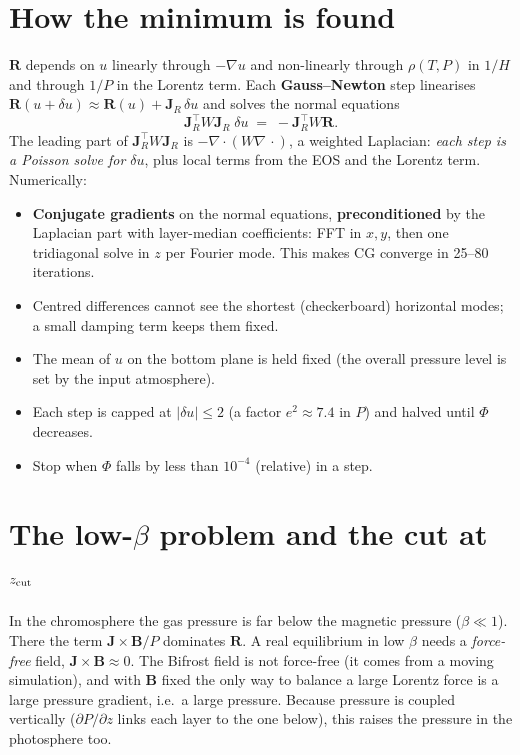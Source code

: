\documentclass[10pt]{extarticle}
\newcommand{\B}{\mathbf B}\newcommand{\J}{\mathbf J}\newcommand{\F}{\mathbf F}\newcommand{\zh}{\hat{\mathbf z}}
\begin{document}
\section{How the minimum is found}
$\mathbf R$ depends on $u$ linearly through $-\nabla u$ and non-linearly through $\rho(T,P)$ in $1/H$ and through $1/P$ in
the Lorentz term. Each \textbf{Gauss--Newton} step linearises $\mathbf R(u+\delta u)\approx\mathbf R(u)+\mathbf J_R\,\delta u$
and solves the normal equations
\[
\mathbf J_R^{\!\top}W\mathbf J_R\;\delta u \;=\; -\mathbf J_R^{\!\top}W\mathbf R .
\]
The leading part of $\mathbf J_R^{\!\top}W\mathbf J_R$ is $-\nabla\!\cdot(W\nabla\,\cdot)$, a weighted Laplacian: \emph{each
step is a Poisson solve for $\delta u$}, plus local terms from the EOS and the Lorentz term. Numerically:
\begin{itemize}
\item \textbf{Conjugate gradients} on the normal equations, \textbf{preconditioned} by the Laplacian part with layer-median
coefficients: FFT in $x,y$, then one tridiagonal solve in $z$ per Fourier mode. This makes CG converge in 25--80 iterations.
\item Centred differences cannot see the shortest (checkerboard) horizontal modes; a small damping term keeps them fixed.
\item The mean of $u$ on the bottom plane is held fixed (the overall pressure level is set by the input atmosphere).
\item Each step is capped at $|\delta u|\le2$ (a factor $e^2\approx7.4$ in $P$) and halved until $\Phi$ decreases.
\item Stop when $\Phi$ falls by less than $10^{-4}$ (relative) in a step.
\end{itemize}

\section{The low-$\beta$ problem and the cut at $z_{\rm cut}$}
In the chromosphere the gas pressure is far below the magnetic pressure ($\beta\ll1$). There the term $\J\times\B/P$
dominates $\mathbf R$. A real equilibrium in low $\beta$ needs a \emph{force-free} field, $\J\times\B\approx0$. The
Bifrost field is not force-free (it comes from a moving simulation), and with $\B$ fixed the only way to balance a
large Lorentz force is a large pressure gradient, i.e.\ a large pressure. Because pressure is coupled vertically
($\partial P/\partial z$ links each layer to the one below), this raises the pressure in the photosphere too.
\end{document}
